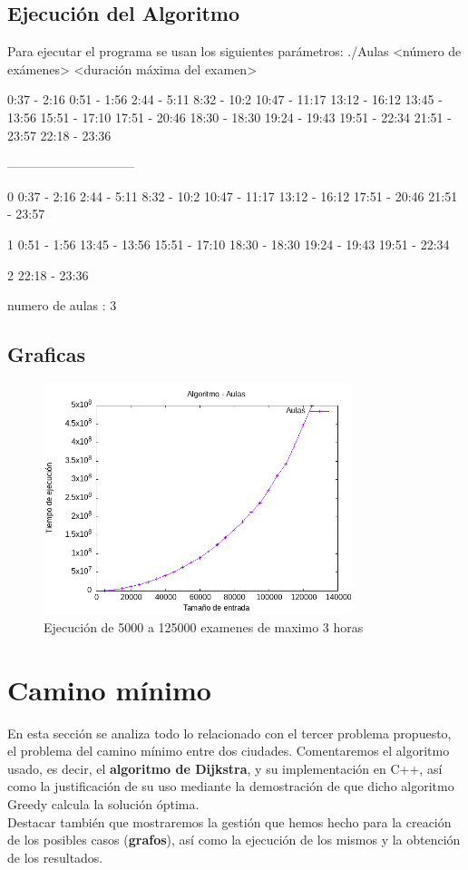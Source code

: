 \documentclass[11pt,openany]{book}
\begin{document}
\section{Ejecución del Algoritmo}
Para ejecutar el programa se usan los siguientes parámetros:
./Aulas <número de exámenes> <duración máxima del examen>

0:37 - 2:16 
0:51 - 1:56 
2:44 - 5:11 
8:32 - 10:2 
10:47 - 11:17 
13:12 - 16:12 
13:45 - 13:56 
15:51 - 17:10 
17:51 - 20:46 
18:30 - 18:30 
19:24 - 19:43 
19:51 - 22:34 
21:51 - 23:57 
22:18 - 23:36 

------------------------------

0
0:37 - 2:16               
2:44 - 5:11 
8:32 - 10:2 
10:47 - 11:17 
13:12 - 16:12 
17:51 - 20:46 
21:51 - 23:57 

1
0:51 - 1:56 
13:45 - 13:56 
15:51 - 17:10 
18:30 - 18:30 
19:24 - 19:43 
19:51 - 22:34 

2 
22:18 - 23:36 

numero de aulas : 3


\section{Graficas}

\begin{figure}[H]
      \centering
      \includegraphics[width=0.8\textwidth]{assets/Img/Aulas.png}
      \caption{Ejecución de 5000 a 125000 examenes de maximo 3 horas}
\end{figure}


\chapter{Camino mínimo} %
En esta sección se analiza todo lo relacionado con el tercer problema propuesto, el problema del camino mínimo entre dos ciudades. 
Comentaremos el algoritmo usado, es decir, el \textbf{algoritmo de Dijkstra}, y su implementación en C++, así como la justificación de su uso mediante
la demostración de que dicho algoritmo Greedy calcula la solución óptima.  \\
Destacar también que mostraremos la gestión que hemos hecho para la creación de los posibles casos (\textbf{grafos}), así como la 
ejecución de los mismos y la obtención de los resultados.
\end{document}
